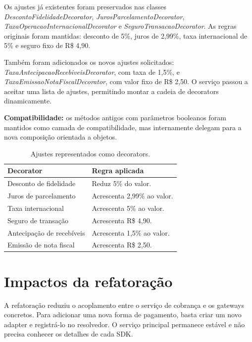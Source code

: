 \documentclass[12pt,a4paper]{article}
\begin{document}
Os ajustes já existentes foram preservados nas classes \textit{DescontoFidelidadeDecorator}, \textit{JurosParcelamentoDecorator}, \textit{TaxaOperacaoInternacionalDecorator} e \textit{SeguroTransacaoDecorator}. As regras originais foram mantidas: desconto de 5\%, juros de 2,99\%, taxa internacional de 5\% e seguro fixo de R\$ 4,90.

Também foram adicionados os novos ajustes solicitados: \textit{TaxaAntecipacaoRecebiveisDecorator}, com taxa de 1,5\%, e \textit{TaxaEmissaoNotaFiscalDecorator}, com valor fixo de R\$ 2,50. O serviço passou a aceitar uma lista de ajustes, permitindo montar a cadeia de decorators dinamicamente.

\begin{resultbox}
\textbf{Compatibilidade:} os métodos antigos com parâmetros booleanos foram mantidos como camada de compatibilidade, mas internamente delegam para a nova composição orientada a objetos.
\end{resultbox}

\begin{table}[H]
\centering
\small
\begin{tabular}{p{}p{}}
\toprule
\textbf{Decorator} & \textbf{Regra aplicada} \\
\midrule
Desconto de fidelidade & Reduz 5\% do valor. \\
Juros de parcelamento & Acrescenta 2,99\% ao valor. \\
Taxa internacional & Acrescenta 5\% ao valor. \\
Seguro de transação & Acrescenta R\$ 4,90. \\
Antecipação de recebíveis & Acrescenta 1,5\% ao valor. \\
Emissão de nota fiscal & Acrescenta R\$ 2,50. \\
\bottomrule
\end{tabular}
\caption{Ajustes representados como decorators.}
\end{table}

\section{Impactos da refatoração}

A refatoração reduziu o acoplamento entre o serviço de cobrança e os gateways concretos. Para adicionar uma nova forma de pagamento, basta criar um novo adapter e registrá-lo no resolvedor. O serviço principal permanece estável e não precisa conhecer os detalhes de cada SDK.
\end{document}
